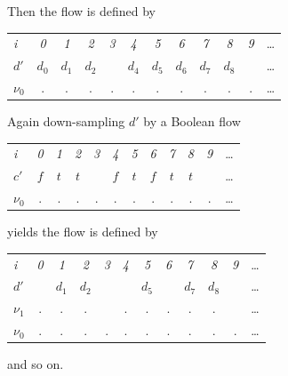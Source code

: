 {Then the flow \emph{} is defined by
\begin{center}
  \leavevmode
  \begin{tabular}[]{l@{\quad}||@{\quad} ccccccccccc}
    \hline\hline  
     \hbox{{\footnotesize \textit{i}}} &{\footnotesize \textit{0}}
     &{\footnotesize \textit{1}}&{\footnotesize \textit{2}}
     &{\footnotesize \textit{3}}&{\footnotesize \textit{4}}
     &{\footnotesize \textit{5}}&{\footnotesize \textit{6}}
     &{\footnotesize \textit{7}}&{\footnotesize \textit{8}}
     &{\footnotesize \textit{9}}&\ldots
   \\      
    \hbox{$d'$} 
    &$d_0$&$d_1$&$d_2$&&$d_4$&$d_5$&$d_6$&$d_7$&$d_8$&&\ldots
   \\
    \hbox{$\nu_{0}$}  &.&.&.&.&.&.&.&.&.&.&\ldots
   \\
   \hline\hline
  \end{tabular}
\end{center}
Again down-sampling $d'$ by a Boolean flow
\begin{center}
  \leavevmode
  \begin{tabular}[]{l@{\quad}||@{\quad} ccccccccccc}
    \hline\hline  
     \hbox{{\footnotesize \textit{i}}} &{\footnotesize \textit{0}}
     &{\footnotesize \textit{1}}&{\footnotesize \textit{2}}
     &{\footnotesize \textit{3}}&{\footnotesize \textit{4}}
     &{\footnotesize \textit{5}}&{\footnotesize \textit{6}}
     &{\footnotesize \textit{7}}&{\footnotesize \textit{8}}
     &{\footnotesize \textit{9}}&\ldots
   \\      
    \hbox{$c'$} 
    &$f$&$t$&$t$&&$f$&$t$&$f$&$t$&$t$&&\ldots
   \\
    \hbox{$\nu_{0}$}  &.&.&.&.&.&.&.&.&.&.&\ldots
   \\
   \hline\hline
  \end{tabular}
\end{center}
yields the flow \emph{} is defined by
\begin{center}
  \leavevmode
  \begin{tabular}[]{l@{\quad}||@{\quad} ccccccccccc}
    \hline\hline  
     \hbox{{\footnotesize \textit{i}}} &{\footnotesize \textit{0}}
     &{\footnotesize \textit{1}}&{\footnotesize \textit{2}}
     &{\footnotesize \textit{3}}&{\footnotesize \textit{4}}
     &{\footnotesize \textit{5}}&{\footnotesize \textit{6}}
     &{\footnotesize \textit{7}}&{\footnotesize \textit{8}}
     &{\footnotesize \textit{9}}&\ldots
   \\      
    \hbox{$d'$} 
    &&$d_1$&$d_2$&&&$d_5$&&$d_7$&$d_8$&&\ldots
   \\
    \hbox{$\nu_{1}$}  &.&.&.&&.&.&.&.&.&&\ldots
   \\
    \hbox{$\nu_{0}$}  &.&.&.&.&.&.&.&.&.&.&\ldots
   \\
   \hline\hline
  \end{tabular}
\end{center}
and so on.

}
